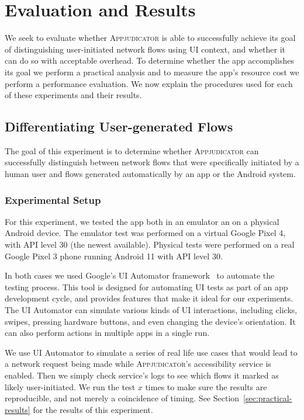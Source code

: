 \section{Evaluation and Results}
\label{sec:evaluation-and-results}

We seek to evaluate whether \textsc{Appjudicator} is able to successfully
achieve its goal of distinguishing user-initiated network flows using UI
context, and whether it can do so with acceptable overhead. To determine whether
the app accomplishes its goal we perform a practical analysis and to measure the
app's resource cost we perform a performance evaluation. We now explain the
procedures used for each of these experiments and their results.

\subsection{Differentiating User-generated Flows}
\label{sec:differentiating-user-generated-flows}

The goal of this experiment is to determine whether \textsc{Appjudicator} can
successfully distinguish between network flows that were specifically initiated
by a human user and flows generated automatically by an app or the Android
system.

\subsubsection{Experimental Setup}
\label{sec:experimental-setup}

For this experiment, we tested the app both in an emulator an on a physical
Android device. The emulator test was performed on a virtual Google Pixel 4,
with API level 30 (the newest available). Physical tests were performed on a
real Google Pixel 3 phone running Android 11 with API level 30.

In both cases we used Google's UI Automator framework~\cite{uiautomator2020} to
automate the testing process. This tool is designed for automating UI tests as
part of an app development cycle, and provides features that make it ideal for
our experiments. The UI Automator can simulate various kinds of UI interactions,
including clicks, swipes, pressing hardware buttons, and even changing the
device's orientation. It can also perform actions in multiple apps in a single
run.

We use UI Automator to simulate a series of real life use cases that would lead
to a network request being made while \textsc{Appjudicator}'s accessibility
service is enabled. Then we simply check service's logs to see which flows it
marked as likely user-initiated. We run the test $x$ times to make sure the
results are reproducible, and not merely a coincidence of timing. See
Section~\ref{sec:practical-results} for the results of this experiment.

